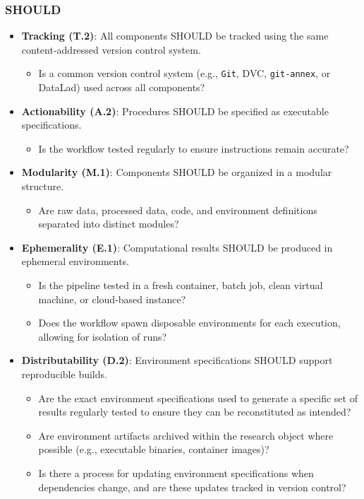 \documentclass{article}
\begin{document}
\subsubsection*{SHOULD}
\begin{itemize}[label=$\triangleright$]
    \item \textbf{Tracking (T.2)}: All components SHOULD be tracked using the same content-addressed version control system.
    \begin{itemize}[label=$\square$]
        \item Is a common version control system (e.g., \texttt{Git}, DVC, \texttt{git-annex}, or DataLad) used across all components?
    \end{itemize}
    \item \textbf{Actionability (A.2)}: Procedures SHOULD be specified as executable specifications.
    \begin{itemize}[label=$\square$]
        \item Is the workflow tested regularly to ensure instructions remain accurate?
    \end{itemize}
    \item \textbf{Modularity (M.1)}: Components SHOULD be organized in a modular structure.
    \begin{itemize}[label=$\square$]
        \item Are raw data, processed data, code, and environment definitions separated into distinct modules?
    \end{itemize}
    \item \textbf{Ephemerality (E.1)}: Computational results SHOULD be produced in ephemeral environments.
    \begin{itemize}[label=$\square$]
        \item Is the pipeline tested in a fresh container, batch job, clean virtual machine, or cloud-based instance?
        \item Does the workflow spawn disposable environments for each execution, allowing for isolation of runs?
    \end{itemize}
    \item \textbf{Distributability (D.2)}: Environment specifications SHOULD support reproducible builds.
    \begin{itemize}[label=$\square$]
        \item Are the exact environment specifications used to generate a specific set of results regularly tested to ensure they can be reconstituted as intended?
        \item Are environment artifacts archived within the research object where possible (e.g., executable binaries, container images)?
        \item Is there a process for updating environment specifications when dependencies change, and are these updates tracked in version control?
    \end{itemize}
\end{itemize}
\end{document}
